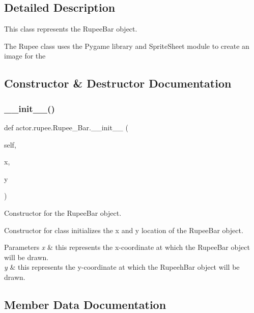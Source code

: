 \subsection{Detailed Description}
This class represents the Rupee\+Bar object. 

The Rupee class uses the Pygame library and Sprite\+Sheet module to create an image for the 

\subsection{Constructor \& Destructor Documentation}
\mbox{\label{classactor_1_1rupee_1_1_rupee___bar_acd0085452fdaff7478db209487bc8a80}} 
\subsubsection{\texorpdfstring{\+\_\+\+\_\+init\+\_\+\+\_\+()}{\_\_init\_\_()}}
{\footnotesize\ttfamily def actor.\+rupee.\+Rupee\+\_\+\+Bar.\+\_\+\+\_\+init\+\_\+\+\_\+ (\begin{DoxyParamCaption}\item[{}]{self,  }\item[{}]{x,  }\item[{}]{y }\end{DoxyParamCaption})}



Constructor for the Rupee\+Bar object. 

Constructor for class initializes the x and y location of the Rupee\+Bar object. 
\begin{DoxyParams}{Parameters}
{\em x} & this represents the x-\/coordinate at which the Rupee\+Bar object will be drawn. \\
\hline
{\em y} & this represents the y-\/coordinate at which the Rupeeh\+Bar object will be drawn. \\
\hline
\end{DoxyParams}


\subsection{Member Data Documentation}
\mbox{\label{classactor_1_1rupee_1_1_rupee___bar_a8a0f7e6f0ac2c12e172d691e2fe4aba4}} 
